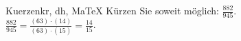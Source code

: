 \begin{MAufgabe}{Kuerzen}{kr, dh, MaTeX}
K\"urzen Sie soweit m\"oglich: $\frac{882}{945}$.\\ 
\ifLsg\MLoesung
\quad $\frac{882}{945}=\frac{(63)\cdot(14)}{(63)\cdot(15)}=\frac{14}{15}$.\else\relax\fi
 \end{MAufgabe}
